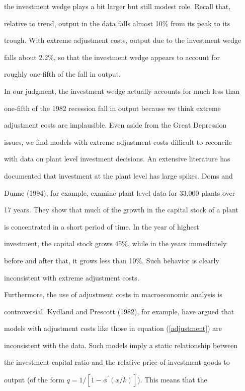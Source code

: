 \documentclass[fleqn,leqno,11pt]{article}
\begin{document}
the investment wedge plays a bit larger but still modest role. Recall that,

relative to trend, output in the data falls almost 10\% from its peak to its

trough. With extreme adjustment costs, output due to the investment wedge

falls about 2.2\%, so that the investment wedge appears to account for

roughly one-fifth of the fall in output.



In our judgment, the investment wedge actually accounts for much less than

one-fifth of the 1982 recession fall in output because we think extreme

adjustment costs are implausible. Even aside from the Great Depression

issues, we find models with extreme adjustment costs difficult to reconcile

with data on plant level investment decisions. An extensive literature has

documented that investment at the plant level has large spikes. Doms and

Dunne (1994), for example, examine plant level data for 33,000 plants over

17 years. They show that much of the growth in the capital stock of a plant

is concentrated in a short period of time. In the year of highest

investment, the capital stock grows 45\%, while in the years immediately

before and after that, it grows less than 10\%. Such behavior is clearly

inconsistent with extreme adjustment costs.



Furthermore, the use of adjustment costs in macroeconomic analysis is

controversial. Kydland and Prescott (1982), for example, have argued that

models with adjustment costs like those in equation (\ref{adjustment}) are

inconsistent with the data. Such models imply a static relationship between

the investment-capital ratio and the relative price of investment goods to

output (of the form $q=1/[1-\phi ^{\prime }(x/k)]$). This means that the
\end{document}
